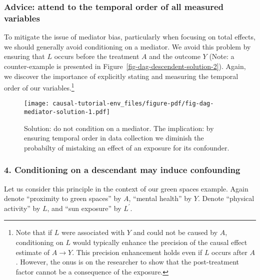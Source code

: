 \documentclass[
  singlecolumn]{article}
\begin{document}
\hypertarget{advice-attend-to-the-temporal-order-of-all-measured-variables-2}{%
\subsubsection{Advice: attend to the temporal order of all measured
variables}\label{advice-attend-to-the-temporal-order-of-all-measured-variables-2}}

To mitigate the issue of mediator bias, particularly when focusing on
total effects, we should generally avoid conditioning on a mediator. We
avoid this problem by ensuring that \(L\) occurs before the treatment
\(A\) and the outcome \(Y\) (Note: a counter-example is presented in
Figure~\ref{fig-dag-descendent-solution-2}). Again, we discover the
importance of explicitly stating and measuring the temporal order of our
variables.\footnote{Note that if \(L\) were associated with \(Y\) and
  could not be caused by \(A\), conditioning on \(L\) would typically
  enhance the precision of the causal effect estimate of \(A \to Y\).
  This precision enhancement holds even if \(L\) occurs after \(A\).
  However, the onus is on the researcher to show that the post-treatment
  factor cannot be a consequence of the exposure.}

\begin{figure}

{\centering \texttt{[image: causal-tutorial-env\_files/figure-pdf/fig-dag-mediator-solution-1.pdf]}

}

\caption{\label{fig-dag-mediator-solution}Solution: do not condition on
a mediator. The implication: by ensuring temporal order in data
collection we diminish the probabilty of mistaking an effect of an
exposure for its confounder.}

\end{figure}

\hypertarget{conditioning-on-a-descendant-may-induce-confounding}{%
\subsubsection{4. Conditioning on a descendant may induce
confounding}\label{conditioning-on-a-descendant-may-induce-confounding}}

Let us consider this principle in the context of our green spaces
example. Again denote ``proximity to green spaces'' by \(A\), ``mental
health'' by \(Y\). Denote ``physical activity'' by \(L\), and ``sun
exposure'' by \(L^\prime\).
\end{document}

